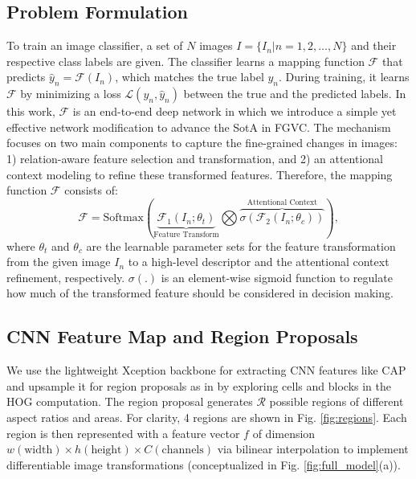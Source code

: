 \documentclass[journal]{IEEEtran}
\begin{document}
\subsection{Problem Formulation}
To train an image classifier, a set of $N$ images $I=\{I_n|n=1, 2, \dots, N\}$ and their respective class labels are given. The classifier learns a mapping function $\mathcal{F}$ that predicts $\hat{y}_n=\mathcal{F}\left(I_n\right)$, which matches the true label $y_n$. During training, it learns $\mathcal{F}$ by minimizing a loss $\mathcal{L}\left(y_n,\hat{y}_n\right)$ between the true and the predicted labels. In this work, $\mathcal{F}$ is an end-to-end deep network in which we introduce a simple yet effective network modification to advance the SotA in FGVC. The mechanism focuses on two main components to capture the fine-grained changes in images: 1) relation-aware feature selection and transformation, and 2) an attentional context modeling to refine these transformed features. Therefore, the mapping function $\mathcal{F}$ consists of:\vspace{-.15cm}
\begin{equation}
    \mathcal{F} = \text{Softmax}\left(\underbrace{\mathcal{F}_1(I_n;\theta_t)}_\textrm{Feature Transform}\bigotimes \overbrace{\sigma(\mathcal{F}_2(I_n;\theta_c))}^\textrm{Attentional Context}\right),
    \label{eq_1}
\end{equation} 
where $\theta_t$ and $\theta_c$ are the learnable parameter sets for the feature transformation from the given image $I_n$ to a high-level descriptor and the attentional context refinement, respectively. $\sigma(.)$ is an element-wise sigmoid function to regulate how much of the transformed feature should be considered in decision making. 
\vspace{-0.5 cm}
\subsection{CNN Feature Map and Region Proposals}\label{sec:roi}
We use the lightweight Xception \cite{chollet2017xception} backbone for extracting CNN features like CAP \cite{behera2021context} 
and upsample it for region proposals as in \cite{behera2020regional} by exploring cells and blocks in the HOG computation. The region proposal generates $\mathcal{R}$ possible regions of different aspect ratios and areas. For clarity, 4 regions are shown in Fig. \ref{fig:regions}. Each region is then represented with a feature vector $f$ of dimension $w (\text{width})\times h(\text{height})\times C(\text{channels})$ via bilinear interpolation to implement differentiable image transformations (conceptualized in Fig. \ref{fig:full_model}(a)).
\end{document}
